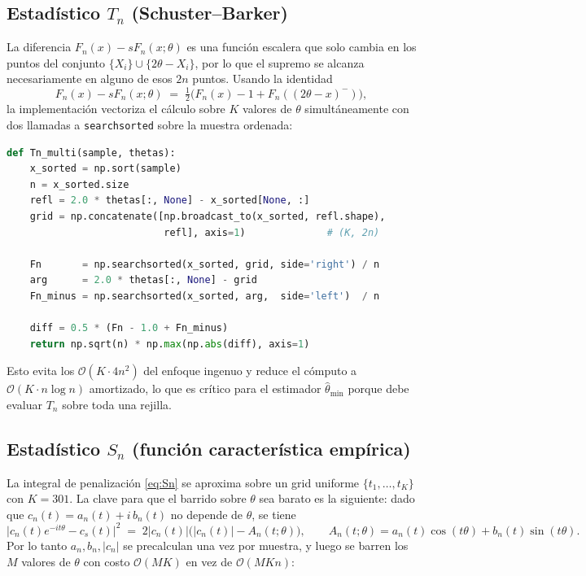 \subsection{Estadístico \texorpdfstring{$T_n$}{T\_n} (Schuster--Barker)}

La diferencia $F_n(x)-sF_n(x;\theta)$ es una función escalera que solo cambia en los puntos del conjunto $\{X_i\}\cup\{2\theta-X_i\}$, por lo que el supremo se alcanza necesariamente en alguno de esos $2n$ puntos. Usando la identidad
\[
F_n(x)-sF_n(x;\theta) \;=\; \tfrac{1}{2}\bigl(F_n(x) - 1 + F_n((2\theta-x)^-)\bigr),
\]
la implementación vectoriza el cálculo sobre $K$ valores de $\theta$ simultáneamente con dos llamadas a \texttt{searchsorted} sobre la muestra ordenada:

\begin{lstlisting}[language=Python]
def Tn_multi(sample, thetas):
    x_sorted = np.sort(sample)
    n = x_sorted.size
    refl = 2.0 * thetas[:, None] - x_sorted[None, :]
    grid = np.concatenate([np.broadcast_to(x_sorted, refl.shape),
                           refl], axis=1)              # (K, 2n)

    Fn       = np.searchsorted(x_sorted, grid, side='right') / n
    arg      = 2.0 * thetas[:, None] - grid
    Fn_minus = np.searchsorted(x_sorted, arg,  side='left')  / n

    diff = 0.5 * (Fn - 1.0 + Fn_minus)
    return np.sqrt(n) * np.max(np.abs(diff), axis=1)
\end{lstlisting}

Esto evita los $\mathcal{O}(K\cdot 4n^2)$ del enfoque ingenuo y reduce el cómputo a $\mathcal{O}(K\cdot n\log n)$ amortizado, lo que es crítico para el estimador $\hat\theta_{\min}$ porque debe evaluar $T_n$ sobre toda una rejilla.

\subsection{Estadístico \texorpdfstring{$S_n$}{S\_n} (función característica empírica)}

La integral de penalización \eqref{eq:Sn} se aproxima sobre un grid uniforme $\{t_1,\dots,t_K\}$ con $K=301$. La clave para que el barrido sobre $\theta$ sea barato es la siguiente: dado que $c_n(t)=a_n(t)+i\,b_n(t)$ no depende de $\theta$, se tiene
\[
\bigl|c_n(t)e^{-it\theta}-c_s(t)\bigr|^2 \;=\; 2|c_n(t)|\bigl(|c_n(t)|-A_n(t;\theta)\bigr),\qquad A_n(t;\theta)=a_n(t)\cos(t\theta)+b_n(t)\sin(t\theta).
\]
Por lo tanto $a_n,b_n,|c_n|$ se precalculan una vez por muestra, y luego se barren los $M$ valores de $\theta$ con costo $\mathcal{O}(MK)$ en vez de $\mathcal{O}(MKn)$:

